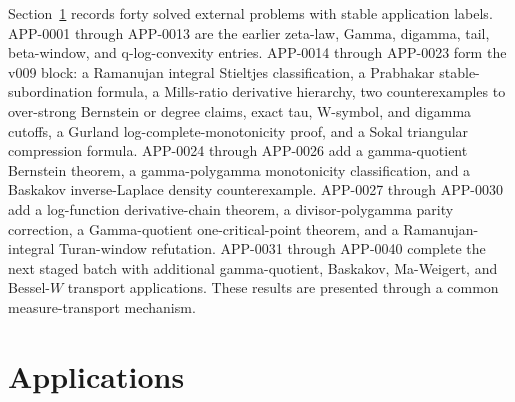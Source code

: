 \documentclass[11pt]{article}
\numberwithin{equation}{section}
\theoremstyle{definition}
\theoremstyle{remark}
\newcommand{\1}{\mathbf 1}
\begin{document}
Section~\ref{sec:applications} records forty solved external problems with stable
application labels.  APP-0001 through APP-0013 are the earlier zeta-law, Gamma,
digamma, tail, beta-window, and q-log-convexity entries.  APP-0014 through
APP-0023 form the v009 block: a Ramanujan integral Stieltjes classification, a
Prabhakar stable-subordination formula, a Mills-ratio derivative hierarchy, two
counterexamples to over-strong Bernstein or degree claims, exact tau, W-symbol,
and digamma cutoffs, a Gurland log-complete-monotonicity proof, and a Sokal
triangular compression formula.  APP-0024 through APP-0026 add a
gamma-quotient Bernstein theorem, a gamma-polygamma monotonicity
classification, and a Baskakov inverse-Laplace density counterexample.  APP-0027
through APP-0030 add a log-function derivative-chain theorem, a
divisor-polygamma parity correction, a Gamma-quotient one-critical-point
theorem, and a Ramanujan-integral Turan-window refutation.  APP-0031 through
APP-0040 complete the next staged batch with additional gamma-quotient,
Baskakov, Ma-Weigert, and Bessel-\(W\) transport applications.  These results
are presented through a common measure-transport mechanism.

\section{Applications}
\label{sec:applications}
\end{document}
